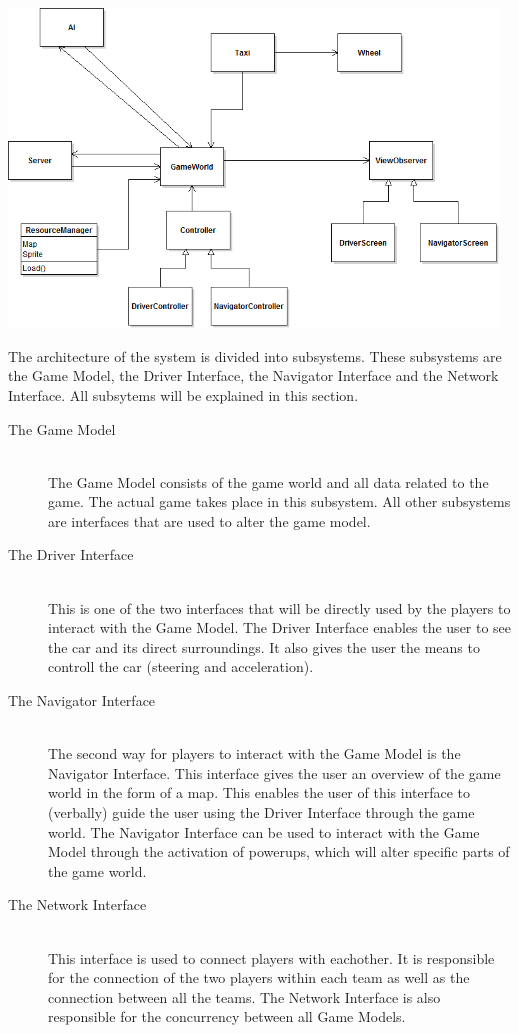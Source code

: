 
\begin{center}
	 \includegraphics[width=130mm]{./images/UML.png}

\end{center}


The architecture of the system is divided into subsystems. These subsystems are the Game Model, the Driver Interface, the Navigator Interface and the Network Interface. All subsytems will be explained in this section.

\begin{description}
	
\item[The Game Model] \hfill \\
The Game Model consists of the game world and all data related to the game. The actual game takes place in this subsystem. All other subsystems are interfaces that are used to alter the game model.

\item[The Driver Interface]  \hfill \\
This is one of the two interfaces that will be directly used by the players to interact with the Game Model. The Driver Interface enables the user to see the car and its direct surroundings. It also gives the user the means to controll the car (steering and acceleration). 

\item[The Navigator Interface]  \hfill \\
The second way for players to interact with the Game Model is the Navigator Interface. This interface gives the user an overview of the game world in the form of a map. This enables the user of this interface to (verbally) guide the user using the Driver Interface through the game world. The Navigator Interface can be used to interact with the Game Model through the activation of powerups, which will alter specific parts of the game world.

\item[The Network Interface]  \hfill \\
This interface is used to connect players with eachother. It is responsible for the connection of the two players within each team as well as the connection between all the teams. The Network Interface is also responsible for the concurrency between all Game Models.

\end{description}
